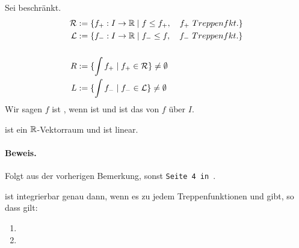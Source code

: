 \documentclass[9pt]{article} %
\begin{document}
\begin{defi}
Sei  beschränkt.   \\
\begin{align*}
    \mathcal{R} & := \kl{f_+ : \itr \mid f \leq f_+, \quad f_+\ Treppenfkt.} \\
    \mathcal{L} & := \kl{f_- : \itr \mid f_-  \leq f, \quad f_- \ Treppenfkt.} \\ \\
    R &:= \kl{\int f_+ \mid f_+ \in \mathcal{R}}  \neq \emptyset\\
    L &:= \kl{\int f_- \mid f_- \in \mathcal{L}}  \neq \emptyset \\
\end{align*}
Wir sagen $f$ ist , wenn  ist und 
 ist das  von $f$ über $I$.  
\end{defi}
\begin{bem}
 ist ein $\mathbb{R}$-Vektorraum und  ist linear. 
\paragraph{Beweis.} Folgt aus der vorherigen Bemerkung, sonst \texttt{Seite 4 in \cite{vor13}}. 
\end{bem}
\begin{bem}
 ist integrierbar genau dann, wenn es zu jedem  Treppenfunktionen  und  gibt, so dass gilt: 
\begin{enumerate}
    \item {}
    \item {}
\end{enumerate}
\end{bem}
\end{document}
